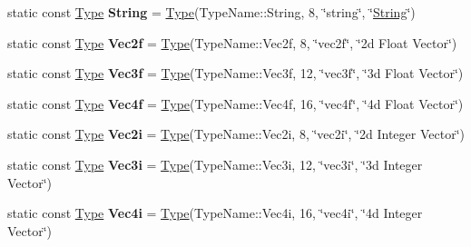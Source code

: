 \begin{DoxyCompactItemize}
static const \mbox{\hyperlink{class_arcana_1_1_type}{Type}} {\bfseries String} = \mbox{\hyperlink{class_arcana_1_1_type}{Type}}(Type\+Name\+::\+String, 8, \char`\"{}string\char`\"{}, \char`\"{}\mbox{\hyperlink{class_arcana_1_1_string}{String}}\char`\"{})
\item 
\mbox{\label{class_arcana_1_1_types_ac167a518c23fc8abd607e88a1eeafdca}} 
static const \mbox{\hyperlink{class_arcana_1_1_type}{Type}} {\bfseries Vec2f} = \mbox{\hyperlink{class_arcana_1_1_type}{Type}}(Type\+Name\+::\+Vec2f, 8, \char`\"{}vec2f\char`\"{}, \char`\"{}2d Float Vector\char`\"{})
\item 
\mbox{\label{class_arcana_1_1_types_a928d9ae7771928aaf035d4fa4fd61b13}} 
static const \mbox{\hyperlink{class_arcana_1_1_type}{Type}} {\bfseries Vec3f} = \mbox{\hyperlink{class_arcana_1_1_type}{Type}}(Type\+Name\+::\+Vec3f, 12, \char`\"{}vec3f\char`\"{}, \char`\"{}3d Float Vector\char`\"{})
\item 
\mbox{\label{class_arcana_1_1_types_a602933ed17ef481eb05f344863f3490a}} 
static const \mbox{\hyperlink{class_arcana_1_1_type}{Type}} {\bfseries Vec4f} = \mbox{\hyperlink{class_arcana_1_1_type}{Type}}(Type\+Name\+::\+Vec4f, 16, \char`\"{}vec4f\char`\"{}, \char`\"{}4d Float Vector\char`\"{})
\item 
\mbox{\label{class_arcana_1_1_types_acd32feaceaaa601d7cce05939c172c40}} 
static const \mbox{\hyperlink{class_arcana_1_1_type}{Type}} {\bfseries Vec2i} = \mbox{\hyperlink{class_arcana_1_1_type}{Type}}(Type\+Name\+::\+Vec2i, 8, \char`\"{}vec2i\char`\"{}, \char`\"{}2d Integer Vector\char`\"{})
\item 
\mbox{\label{class_arcana_1_1_types_abfae9e702eecc86cff52a70312d4d1d5}} 
static const \mbox{\hyperlink{class_arcana_1_1_type}{Type}} {\bfseries Vec3i} = \mbox{\hyperlink{class_arcana_1_1_type}{Type}}(Type\+Name\+::\+Vec3i, 12, \char`\"{}vec3i\char`\"{}, \char`\"{}3d Integer Vector\char`\"{})
\item 
\mbox{\label{class_arcana_1_1_types_ab180e12bae8f9f6d54182b684e610f83}} 
static const \mbox{\hyperlink{class_arcana_1_1_type}{Type}} {\bfseries Vec4i} = \mbox{\hyperlink{class_arcana_1_1_type}{Type}}(Type\+Name\+::\+Vec4i, 16, \char`\"{}vec4i\char`\"{}, \char`\"{}4d Integer Vector\char`\"{})

\end{DoxyCompactItemize}

